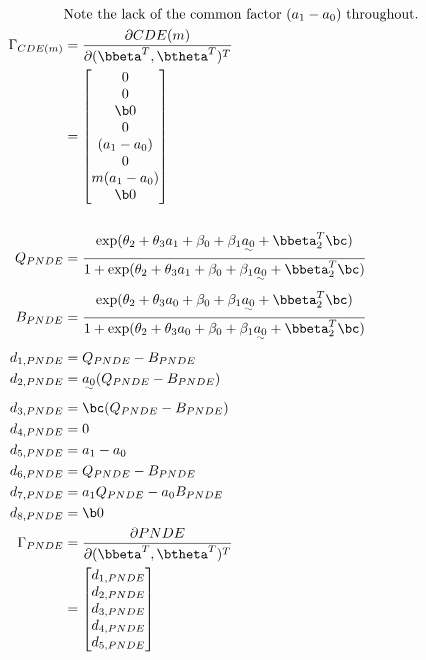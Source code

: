 \documentclass[dvipdfmx,10pt]{article}
\begin{document}
\begin{align*}
  &\text{Note the lack of the common factor $(a_{1} - a_{0})$ throughout.}\\
  \Gamma_{CDE(m)}
  &= \frac{\partial CDE(m)}{\partial (\bbeta^{T},\btheta^{T})^{T}}\\
  &=
    \begin{bmatrix}
      0\\
      0\\
      \b0\\
      0\\
      (a_{1} - a_{0})\\
      0\\
      m(a_{1} - a_{0})\\
      \b0\\
    \end{bmatrix}\\
  \\
  Q_{PNDE} &= \frac
             {    \exp(\theta_{2} + \theta_{3}a_{1} + \beta_{0} + \beta_{1}\uwave{a_{0}} + \bbeta_{2}^{T}\bc)}
             {1 + \exp(\theta_{2} + \theta_{3}a_{1} + \beta_{0} + \beta_{1}\uwave{a_{0}} + \bbeta_{2}^{T}\bc)}\\
  B_{PNDE} &= \frac
             {    \exp(\theta_{2} + \theta_{3}a_{0} + \beta_{0} + \beta_{1}\uwave{a_{0}} + \bbeta_{2}^{T}\bc)}
             {1 + \exp(\theta_{2} + \theta_{3}a_{0} + \beta_{0} + \beta_{1}\uwave{a_{0}} + \bbeta_{2}^{T}\bc)}\\
      d_{1,PNDE} &= Q_{PNDE} - B_{PNDE}\\
      d_{2,PNDE} &= \uwave{a_{0}} (Q_{PNDE} - B_{PNDE})\\
      d_{3,PNDE} &= \bc (Q_{PNDE} - B_{PNDE})\\
      d_{4,PNDE} &= 0\\
      d_{5,PNDE} &= a_{1} - a_{0}\\
      d_{6,PNDE} &= Q_{PNDE} - B_{PNDE}\\
      d_{7,PNDE} &= a_{1}Q_{PNDE} - a_{0}B_{PNDE}\\
      d_{8,PNDE} &= \b0\\
  \Gamma_{PNDE}
  &= \frac{\partial PNDE}{\partial (\bbeta^{T},\btheta^{T})^{T}}\\
  &= \begin{bmatrix}
      d_{1,PNDE}\\
      d_{2,PNDE}\\
      d_{3,PNDE}\\
      d_{4,PNDE}\\
      d_{5,PNDE}\\

\end{bmatrix}
\end{align*}
\end{document}
